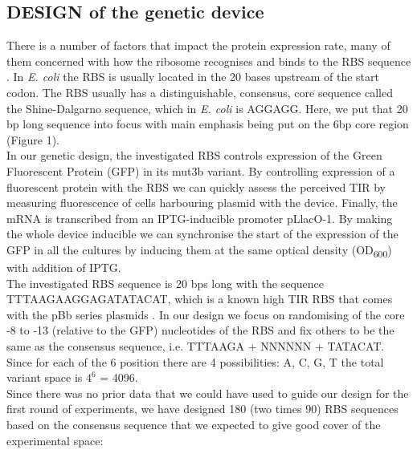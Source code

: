 \documentclass{article}
\begin{document}
\subsection{DESIGN of the genetic device}
There is a number of factors that impact the protein expression rate, many of them concerned with how the ribosome recognises and binds to the RBS sequence \cite{Chen1994,Vellanoweth1992}. In \emph{E. coli} the RBS is usually located in the 20 bases upstream of the start codon. The RBS usually has a distinguishable, consensus, core sequence called the Shine-Dalgarno sequence, which in \emph{E. coli} is AGGAGG. Here, we put that 20 bp long sequence into focus with main emphasis being put on the 6bp core region (Figure 1).\\
In our genetic design, the investigated RBS controls expression of the Green Fluorescent Protein (GFP) in its mut3b variant. By controlling expression of a fluorescent protein with the RBS we can quickly assess the perceived TIR by measuring fluorescence of cells harbouring plasmid with the device. Finally, the mRNA is transcribed from an IPTG-inducible promoter pLlacO-1. By making the whole device inducible we can synchronise the start of the expression of the GFP in all the cultures by inducing them at the same optical density (OD\textsubscript{600}) with addition of IPTG.\\
The investigated RBS sequence is 20 bps long with the sequence TTTAAGAAGGAGATATACAT, which is a known high TIR RBS that comes with the pBb series plasmids \cite{Lee2011}. In our design we focus on randomising of the core -8 to -13 (relative to the GFP) nucleotides of the RBS and fix others to be the same as the consensus sequence, i.e. TTTAAGA + NNNNNN + TATACAT. Since for each of the 6 position there are 4 possibilities: A, C, G, T the total variant space is $4^6$ = 4096.\\
Since there was no prior data that we could have used to guide our design for the first round of experiments, we have designed 180 (two times 90) RBS sequences based on the consensus sequence that we expected to give good cover of the experimental space: 
\end{document}
